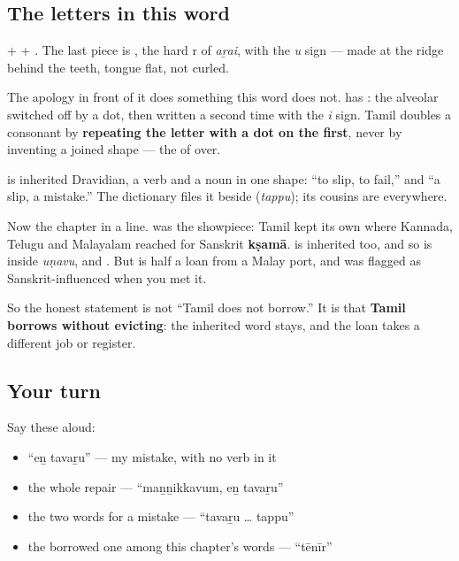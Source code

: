 \subsection*{The letters in this word}
\textbf{} + \textbf{} + \textbf{}. The last piece is \textbf{}, the hard r of \emph{aṟai}, with the \emph{u} sign — made at the ridge behind the teeth, tongue flat, not curled.

The apology in front of it does something this word does not. \textbf{} has \textbf{}: the alveolar \textbf{} switched off by a dot, then written a second time with the \emph{i} sign. Tamil doubles a consonant by \textbf{repeating the letter with a dot on the first}, never by inventing a joined shape — the \textbf{} of \textbf{} over.

\begin{cousinweb}
\textbf{} is inherited Dravidian, a verb and a noun in one shape: \textquotedblleft{}to slip, to fail,\textquotedblright{} and \textquotedblleft{}a slip, a mistake.\textquotedblright{} The dictionary files it beside \textbf{} (\emph{tappu}); its cousins are everywhere.

Now the chapter in a line. \textbf{} was the showpiece: Tamil kept its own \textbf{} where Kannada, Telugu and Malayalam reached for Sanskrit \textbf{kṣamā}. \textbf{} is inherited too, and so is \textbf{} inside \emph{uṇavu}, and \textbf{}. But \textbf{} is half a loan from a Malay port, and \textbf{} was flagged as Sanskrit-influenced when you met it.

So the honest statement is not \textquotedblleft{}Tamil does not borrow.\textquotedblright{} It is that \textbf{Tamil borrows without evicting}: the inherited word stays, and the loan takes a different job or register.
\end{cousinweb}

\subsection*{Your turn}
Say these aloud:

\begin{itemize}
\raggedright
  \item \textquotedblleft{}eṉ tavaṟu\textquotedblright{} — my mistake, with no verb in it
  \item the whole repair — \textquotedblleft{}maṉṉikkavum, eṉ tavaṟu\textquotedblright{}
  \item the two words for a mistake — \textquotedblleft{}tavaṟu … tappu\textquotedblright{}
  \item the borrowed one among this chapter's words — \textquotedblleft{}tēnīr\textquotedblright{}
\end{itemize}

